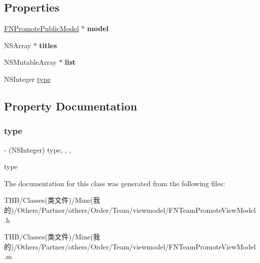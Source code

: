 \subsection*{Properties}
\begin{DoxyCompactItemize}
\item 
\mbox{\label{interface_f_n_team_promote_view_model_a6ef880c508ac5d2e4bbb8fe918cfa514}} 
\mbox{\hyperlink{interface_f_n_promote_public_model}{F\+N\+Promote\+Public\+Model}} $\ast$ {\bfseries model}
\item 
\mbox{\label{interface_f_n_team_promote_view_model_a6d80c585fd4500be3da84a2d5a29ec46}} 
N\+S\+Array $\ast$ {\bfseries titles}
\item 
\mbox{\label{interface_f_n_team_promote_view_model_a6eb46242ebc53c05fea09a2677ecf473}} 
N\+S\+Mutable\+Array $\ast$ {\bfseries list}
\item 
N\+S\+Integer \mbox{\hyperlink{interface_f_n_team_promote_view_model_ac739b31c425f76bc65d8ec22510fd74b}{type}}
\end{DoxyCompactItemize}


\subsection{Property Documentation}
\mbox{\label{interface_f_n_team_promote_view_model_ac739b31c425f76bc65d8ec22510fd74b}} 
\subsubsection{\texorpdfstring{type}{type}}
{\footnotesize\ttfamily -\/ (N\+S\+Integer) type\hspace{0.3cm}{\ttfamily [read]}, {\ttfamily [write]}, {\ttfamily [nonatomic]}, {\ttfamily [assign]}}

type 

The documentation for this class was generated from the following files\+:\begin{DoxyCompactItemize}
\item 
T\+H\+B/\+Classes(类文件)/\+Mine(我的)/\+Others/\+Partner/others/\+Order/\+Team/viewmodel/F\+N\+Team\+Promote\+View\+Model.\+h\item 
T\+H\+B/\+Classes(类文件)/\+Mine(我的)/\+Others/\+Partner/others/\+Order/\+Team/viewmodel/F\+N\+Team\+Promote\+View\+Model.\+m\end{DoxyCompactItemize}
